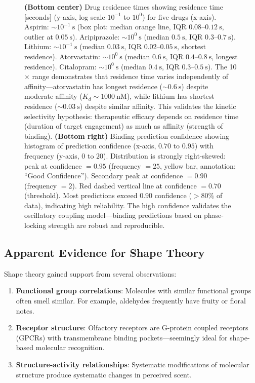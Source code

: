 \begin{figure}[htbp]
{    \textbf{(Bottom center)} Drug residence times showing residence time [seconds] (y-axis, log scale $10^{-1}$ to $10^0$) for five drugs (x-axis). Aspirin: $\sim 10^{-1}~\text{s}$ (box plot: median orange line, IQR $0.08$--$0.12~\text{s}$, outlier at $0.05~\text{s}$). Aripiprazole: $\sim 10^0~\text{s}$ (median $0.5~\text{s}$, IQR $0.3$--$0.7~\text{s}$). Lithium: $\sim 10^{-1}~\text{s}$ (median $0.03~\text{s}$, IQR $0.02$--$0.05~\text{s}$, shortest residence). Atorvastatin: $\sim 10^0~\text{s}$ (median $0.6~\text{s}$, IQR $0.4$--$0.8~\text{s}$, longest residence). Citalopram: $\sim 10^0~\text{s}$ (median $0.4~\text{s}$, IQR $0.3$--$0.5~\text{s}$). The 10$\times$ range demonstrates that residence time varies independently of affinity---atorvastatin has longest residence ($\sim 0.6~\text{s}$) despite moderate affinity ($K_d \sim 1000~\text{nM}$), while lithium has shortest residence ($\sim 0.03~\text{s}$) despite similar affinity. This validates the kinetic selectivity hypothesis: therapeutic efficacy depends on residence time (duration of target engagement) as much as affinity (strength of binding).
    \textbf{(Bottom right)} Binding prediction confidence showing histogram of prediction confidence (x-axis, $0.70$ to $0.95$) with frequency (y-axis, $0$ to $20$). Distribution is strongly right-skewed: peak at confidence $= 0.95$ (frequency $= 25$, yellow bar, annotation: ``Good Confidence''). Secondary peak at confidence $= 0.90$ (frequency $= 2$). Red dashed vertical line at confidence $= 0.70$ (threshold). Most predictions exceed $0.90$ confidence ($> 80\%$ of data), indicating high reliability. The high confidence validates the oscillatory coupling model---binding predictions based on phase-locking strength are robust and reproducible.
    }
    \label{fig:molecular_binding}
\end{figure}


\subsection{Apparent Evidence for Shape Theory}

Shape theory gained support from several observations:

\begin{enumerate}
\item \textbf{Functional group correlations}: Molecules with similar functional groups often smell similar. For example, aldehydes frequently have fruity or floral notes.

\item \textbf{Receptor structure}: Olfactory receptors are G-protein coupled receptors (GPCRs) with transmembrane binding pockets—seemingly ideal for shape-based molecular recognition.

\item \textbf{Structure-activity relationships}: Systematic modifications of molecular structure produce systematic changes in perceived scent.
\end{enumerate}

